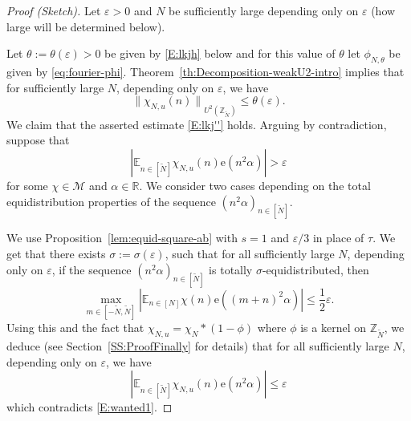 \documentclass[11pt]{amsart}
\theoremstyle{definition}
\begin{document}
\begin{proof}[Proof (Sketch)] Let ${\varepsilon}>0$ and $N$ be sufficiently large depending only on ${\varepsilon}$ (how large will be determined below).

Let  $\theta:=\theta({\varepsilon})>0$   be  given by   \eqref{E:lkjh}
below and for this value of $\theta$ let $\phi_{N,\theta}$ be given
by \eqref{eq:fourier-phi}.
 Theorem~\ref{th:Decomposition-weakU2-intro} implies
that for sufficiently large $N$, depending only on ${\varepsilon}$, we have
\begin{equation}\label{E:lkjh'}
{\lVert {\chi_{N,u}(n)} \rVert}_{U^2({{\mathbb Z}}_{{\widetilde N}})}\leq \theta({\varepsilon}).
\end{equation}
 We claim that the asserted estimate
\eqref{E:lkj''} holds. Arguing by contradiction,  suppose
that
\begin{equation}\label{E:wanted1}
|{{\mathbb E}}_{n\in [{{\widetilde N}}]}\chi_{N,u}(n) {\mathrm{e}}(n^2\alpha)|> {\varepsilon}
\end{equation}
for some $\chi\in {{\mathcal M}}$ and  $\alpha\in {{\mathbb R}}$.
We consider two cases depending on the total equidistribution
properties of the  sequence $(n^2\alpha)_{n\in [{{\widetilde N}}]}$.

\medskip

  We use
    Proposition~\ref{lem:equid-square-ab} with $s=1$ and   ${\varepsilon}/3$ in place of $\tau$.  We get that there exists
    $\sigma:=\sigma({\varepsilon})$,  such that for all sufficiently large $N$, depending only on ${\varepsilon}$,
if the sequence $(n^2\alpha)_{n\in [{{\widetilde N}}]}$ is totally
$\sigma$-equidistributed, then
$$
\max_{m\in [-{{\widetilde N}},{{\widetilde N}}]}|{{\mathbb E}}_{n\in [N]}\chi(n) {\mathrm{e}}((m+n)^2\alpha)|\leq
\frac{1}{2}{\varepsilon}.
$$
Using this and  the  fact that $\chi_{N,u}=\chi_N*(1-\phi)$ where  $\phi$ is a kernel on ${{{\mathbb Z}}_{\widetilde N}}$,
we deduce   (see Section~\ref{SS:ProofFinally} for details) that for
all sufficiently large $N$, depending only on ${\varepsilon}$, we have
$$
|{{\mathbb E}}_{n\in [{{\widetilde N}}]}\chi_{N,u}(n) {\mathrm{e}}(n^2\alpha)|\leq {\varepsilon}
$$
which contradicts \eqref{E:wanted1}.

\medskip


\end{proof}
\end{document}
